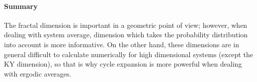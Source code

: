 \paragraph{Summary}
                                            \toCB
The fractal dimension is important in a geometric point of view; however,
when dealing with system average, dimension which takes the probability
distribution into account is more informative. On the other hand, these
dimensions are in general difficult to calculate numerically for high
dimensional systems (except the KY dimension), so that is why cycle
expansion is more powerful when dealing with ergodic averages.
